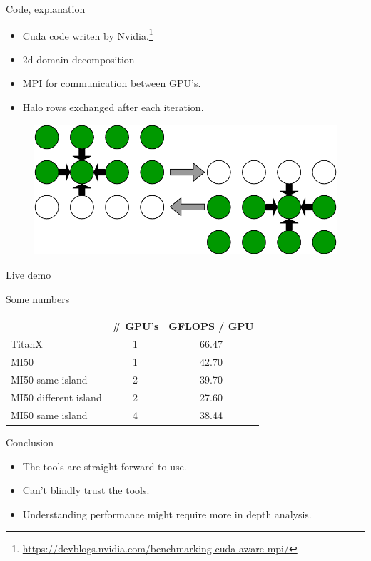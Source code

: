 \documentclass[aspectratio=169]{beamer}
\begin{document}
\begin{frame}{Code, explanation}
\begin{itemize}
    \item Cuda code writen by Nvidia.\footnote{\url{https://devblogs.nvidia.com/benchmarking-cuda-aware-mpi/}}
    \item 2d domain decomposition
    \item MPI for communication between GPU's.
    \item Halo rows exchanged after each iteration.
\end{itemize}
\begin{figure}[hb!]
    \centering
    \includegraphics[scale=0.5]{figs/halo_sharing.pdf}
    \label{fig:my_label}
\end{figure}


\end{frame}

\begin{frame}{Live demo}
\end{frame}

\begin{frame}{Some numbers}
\begin{table}[]
\begin{tabular}{@{}lcc@{}}
\toprule
\multicolumn{1}{c}{}  & \# GPU's & GFLOPS / GPU         \\ \midrule
TitanX                & 1        &     66.47            \\
MI50                  & 1        &     42.70            \\
MI50 same island      & 2        &     39.70            \\
MI50 different island & 2        &     27.60            \\
MI50 same island      & 4        &     38.44            \\ \bottomrule
\end{tabular}
\end{table}
\end{frame}

\begin{frame}{Conclusion}
\begin{itemize}
    \item The tools are straight forward to use.
    \item Can't blindly trust the tools.
    \item Understanding performance might require more in depth analysis.
\end{itemize}
\end{frame}
\end{document}
